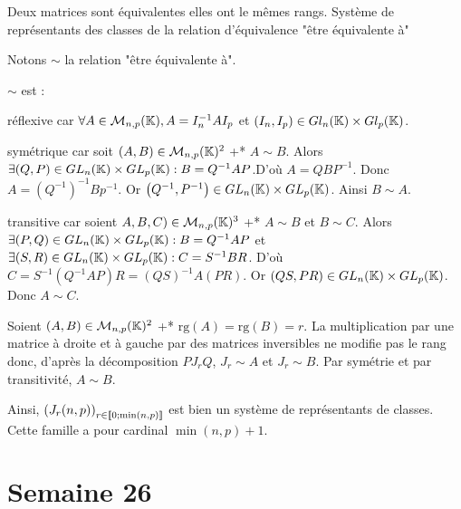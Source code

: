 \documentclass{article}
\renewenvironment{question_kholle}[2][ ]
{
	\subsection{\texorpdfstring{#2}{}}
	\notblank{#1}
	{
		\noindent #1
		\bigbreak
	}
	{}
	\begin{proof}
}
{
	\end{proof}
}
\begin{document}
\begin{question_kholle}[{
        Soient $(A, B) \in \mathcal{M}_{n, p}(\mathbb{K})^2$. $A$ est équivalente à $B$ s'il existe $(P, Q) \in GL_n(\K) \times GL_p(\K)$ \tq* $B = Q^{-1} A P$.

        Montrons que deux matrices sont équivalentes \ssi elles ont le mêmes rangs, que "être équivalente à" est une relation d'équivalence, qu'il y a $\min(n, p) + 1$ classes et que $\left(J_r(n, p)\right)_{r \in \lient 0; \min(n, p) \rient}$ est un système de représentants de classes.
      }]
  {Deux matrices sont équivalentes \ssi elles ont le mêmes rangs. Système de représentants des classes de la relation d'équivalence "être équivalente à"}

  Notons $\sim$ la relation "être équivalente à".

  $\sim$ est :
  \begin{liste}
    \item réflexive car $\forall A \in \mathcal{M}_{n, p}(\mathbb K), A = I_n^{-1} A I_p$ et $(I_n, I_p) \in Gl_n(\mathbb K) \times Gl_p(\mathbb K)$.
    \item symétrique car soit $(A, B) \in \mathcal{M}_{n, p}(\mathbb K)^2$ \tq+* $A \sim B$.
    Alors $\exists (Q, P) \in GL_n(\mathbb K) \times GL_p(\mathbb K) : B = Q^{-1} A P$.D'où $A = Q B P^{-1}$.
    Donc $A = \left(Q^{-1}\right)^{-1} B p^{-1}$.
    Or $\left(Q^{-1}, P^{-1}\right) \in GL_n(\mathbb K) \times GL_p(\mathbb K)$. Ainsi $B \sim A$.
    \item transitive car soient $A, B, C) \in \mathcal{M}_{n, p}(\mathbb K)^3$ \tq+* $A \sim B$ et $B \sim C$.
    Alors $\exists (P, Q) \in GL_n(\mathbb K) \times GL_p(\mathbb K) : B = Q^{-1} A P$ et $\exists (S, R) \in GL_n(\mathbb K) \times GL_p(\mathbb K) : C = S^{-1} B R$.
    D'où $C = S^{-1} \left(Q^{-1} A P\right) R = (QS)^{-1} A (PR)$.
    Or $(QS, PR) \in GL_n(\mathbb K) \times GL_p(\mathbb K)$.
    Donc $A \sim C$.
  \end{liste}

  Soient $(A, B) \in \mathcal{M}_{n, p}(\mathbb K)^2$ \tq+* $\mathrm{rg}(A) = \mathrm{rg}(B) = r$.
  La multiplication par une matrice à droite et à gauche par des matrices inversibles ne modifie pas le rang donc, d'après la décomposition $P J_r Q$, $J_r \sim A$ et $J_r \sim B$.
  Par symétrie et par transitivité, $A \sim B$.

  Ainsi, $\left(J_r(n, p)\right)_{r \in \lient 0; \min(n, p) \rient}$ est bien un système de représentants de classes.
  Cette famille a pour cardinal $\min(n, p) + 1$.
\end{question_kholle}
\pagebreak\section{Semaine 26}
\end{document}
